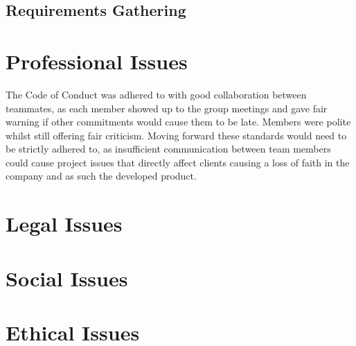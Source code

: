 \documentclass[]{report}
\begin{document}
\subsection{Requirements Gathering}

\section{Professional Issues}
The Code of Conduct was adhered to with good collaboration between teammates, as each member showed up to the group meetings and gave fair warning if other commitments would cause them to be late. Members were polite whilst still offering fair criticism. Moving forward these standards would need to be strictly adhered to, as insufficient communication between team members could cause project issues that directly affect clients causing a loss of faith in the company and as such the developed product.

\section{Legal Issues}



\section{Social Issues}


\section{Ethical Issues}

	
	
	\newpage
	\begin{appendices}
		
		
		
	\end{appendices}
\end{document}
